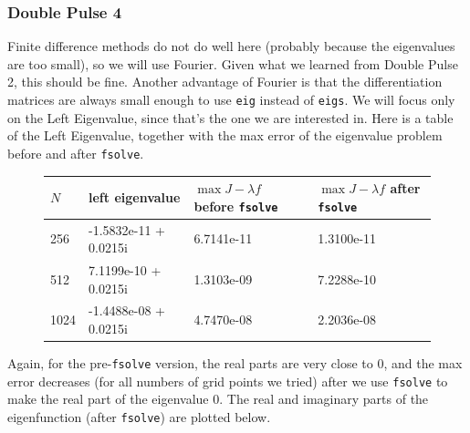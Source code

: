 \documentclass[12pt]{article}
\begin{document}
\subsubsection*{Double Pulse 4}
Finite difference methods do not do well here (probably because the eigenvalues are too small), so we will use Fourier. Given what we learned from Double Pulse 2, this should be fine. Another advantage of Fourier is that the differentiation matrices are always small enough to use \texttt{eig} instead of \texttt{eigs}. We will focus only on the Left Eigenvalue, since that's the one we are interested in. Here is a table of the Left Eigenvalue, together with the max error of the eigenvalue problem before and after \texttt{fsolve}.

\begin{figure}[H]
\begin{tabular}{l|lll}
  $N$   & left eigenvalue &  $\max J -\lambda f$ before \texttt{fsolve}  &  $\max J -\lambda f$ after \texttt{fsolve} \\ \hline
  256   &  -1.5832e-11 + 0.0215i &  6.7141e-11  &  1.3100e-11   \\ 
  512   &   7.1199e-10 + 0.0215i &  1.3103e-09  &  7.2288e-10   \\ 
  1024  &  -1.4488e-08 + 0.0215i &  4.7470e-08  &  2.2036e-08 \\
\end{tabular}
\end{figure}

Again, for the pre-\texttt{fsolve} version, the real parts are very close to 0, and the max error decreases (for all numbers of grid points we tried) after we use \texttt{fsolve} to make the real part of the eigenvalue 0. The real and imaginary parts of the eigenfunction (after \texttt{fsolve}) are plotted below.
\end{document}
